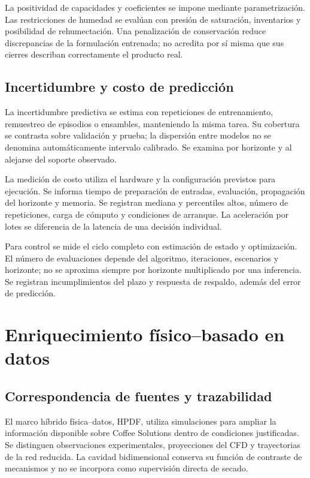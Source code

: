 La positividad de capacidades y coeficientes se impone mediante parametrización. Las restricciones de humedad se evalúan con presión de saturación, inventarios y posibilidad de rehumectación. Una penalización de conservación reduce discrepancias de la formulación entrenada; no acredita por sí misma que sus cierres describan correctamente el producto real.

\subsection{Incertidumbre y costo de predicción}

La incertidumbre predictiva se estima con repeticiones de entrenamiento, remuestreo de episodios o ensambles, manteniendo la misma tarea. Su cobertura se contrasta sobre validación y prueba; la dispersión entre modelos no se denomina automáticamente intervalo calibrado. Se examina por horizonte y al alejarse del soporte observado.

La medición de costo utiliza el hardware y la configuración previstos para ejecución. Se informa tiempo de preparación de entradas, evaluación, propagación del horizonte y memoria. Se registran mediana y percentiles altos, número de repeticiones, carga de cómputo y condiciones de arranque. La aceleración por lotes se diferencia de la latencia de una decisión individual.

Para control se mide el ciclo completo con estimación de estado y optimización. El número de evaluaciones depende del algoritmo, iteraciones, escenarios y horizonte; no se aproxima siempre por horizonte multiplicado por una inferencia. Se registran incumplimientos del plazo y respuesta de respaldo, además del error de predicción.

\section{Enriquecimiento físico--basado en datos}
\label{met:hpdf}

\subsection{Correspondencia de fuentes y trazabilidad}

El marco híbrido física--datos, HPDF, utiliza simulaciones para ampliar la información disponible sobre Coffee Solutions dentro de condiciones justificadas. Se distinguen observaciones experimentales, proyecciones del CFD y trayectorias de la red reducida. La cavidad bidimensional conserva su función de contraste de mecanismos y no se incorpora como supervisión directa de secado.

